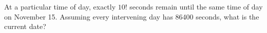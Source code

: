 At a particular time of day, exactly $10!$ seconds remain until the same time of day on November 15. Assuming every intervening day has 86400 seconds, what is the current date?
